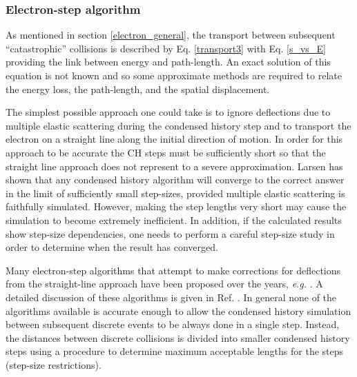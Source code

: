 \subsubsection{Electron-step algorithm}
\label{es_algorithm}
\setcounter{equation}{0}

As mentioned in section \ref{electron_general},
the transport between
subsequent ``catastrophic'' collisions is described by
Eq. \eqref{transport3} with Eq. \eqref{s_vs_E} providing
the link between energy and path-length. An exact solution
of this equation is not known and so some approximate
methods are required to relate the
energy loss, the path-length, and the spatial displacement.

The simplest possible
approach one could take is to ignore deflections due
to multiple elastic scattering
during the condensed history step and
to transport the electron on a straight line along the initial
direction of motion. In order for this approach to
be accurate the CH steps must be sufficiently short so
that the straight line approach does not represent to a
severe approximation. Larsen has shown \cite{La92} that
any condensed history algorithm will converge to the correct
answer in the limit of sufficiently small step-sizes, provided
multiple elastic scattering is faithfully simulated.
However, making the step lengths very short may
cause the simulation to become extremely inefficient.
In addition, if the calculated results show step-size
dependencies, one needs to perform a careful step-size
study in order to determine when the result has
converged.

Many electron-step algorithms that attempt to make
corrections for deflections from the straight-line
approach have been proposed over the years, {\em e.g.}
\cite{Be63,BR87,Fe93,Ka96b}. A detailed discussion of these
algorithms is given in Ref. \cite{KB97a}.  In general
none of the algorithms available is accurate enough
to allow the condensed history simulation between
subsequent discrete events to be always done in a single
step. Instead, the distances between discrete collisions
is divided into smaller condensed history steps using
a procedure to determine maximum acceptable
lengths for the steps (step-size restrictions).

